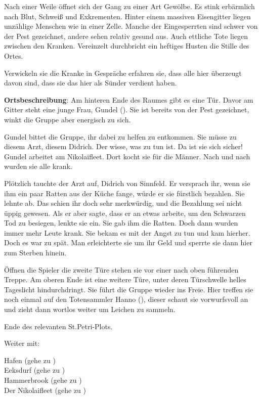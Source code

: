 
Nach einer Weile öffnet sich der Gang zu einer Art Gewölbe. Es stink erbärmlich nach Blut, Schweiß und Exkrementen. Hinter einem massiven Eisengitter liegen unzählige Menschen wie in einer Zelle. Manche der Eingesperrten sind schwer von der Pest gezeichnet, andere sehen relativ gesund aus. Auch ettliche Tote liegen zwischen den Kranken. Vereinzelt durchbricht ein heftiges Husten die Stille des Ortes.


Verwickeln sie die Kranke in Gespräche erfahren sie, dass alle hier überzeugt davon sind, dass sie das hier als Sünder verdient haben.

\textbf{Ortsbeschreibung}: Am hinteren Ende des Raumes gibt es eine Tür. Davor am Gitter steht eine junge Frau, Gundel (\blue{\ref{}}). Sie ist bereits von der Pest gezeichnet, winkt die Gruppe aber energisch zu sich.

Gundel bittet die Gruppe, ihr dabei zu helfen zu entkommen. Sie müsse zu diesem Arzt, diesem Didrich. Der wisse, was zu tun ist. Da ist sie sich sicher! Gundel arbeitet am Nikolaifleet. Dort kocht sie für die Männer. Nach und nach wurden sie alle krank.

Plötzlich tauchte der Arzt auf, Didrich von Sinnfeld. Er versprach ihr, wenn sie ihm ein paar Ratten aus der Küche fange, würde er sie fürstlich bezahlen. Sie lehnte ab. Das schien ihr doch sehr merkwürdig, und die Bezahlung sei nicht üppig gewesen. Als er aber sagte, dass er an etwas arbeite, um den Schwarzen Tod zu besiegen, lenkte sie ein. Sie gab ihm die Ratten. Doch dann wurden immer mehr Leute krank. Sie bekam es mit der Angst zu tun und kam hierher. Doch es war zu spät. Man erleichterte sie um ihr Geld und sperrte sie dann hier zum Sterben hinein.


Öffnen die Spieler die zweite Türe stehen sie vor einer nach oben führenden Treppe. Am oberen Ende ist eine weitere Türe, unter deren Türschwelle helles Tageslicht hindurchdringt. Sie führt die Gruppe wieder ins Freie. Hier treffen sie noch einmal auf den Totensammler Hanno (\blue{\ref{Hanno}}), dieser schaut sie vorwurfsvoll an und zieht dann wortlos weiter um Leichen zu sammeln.


Ende des relevanten St.Petri-Plots.

Weiter mit:

Hafen (gehe zu \blue{\ref{Hafen}}) \\
Eeksdurf (gehe zu \blue{\ref{xd}}) \\
Hammerbrook (gehe zu \blue{\ref{arm}}) \\
Der Nikolaifleet (gehe zu \blue{\ref{Fleet}}) \\

